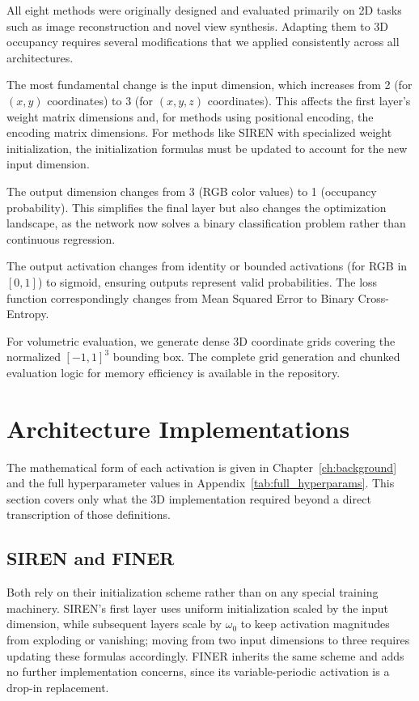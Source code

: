 All eight methods were originally designed and evaluated primarily on 2D tasks such as image reconstruction and novel view synthesis. Adapting them to 3D occupancy requires several modifications that we applied consistently across all architectures.

The most fundamental change is the input dimension, which increases from 2 (for $(x, y)$ coordinates) to 3 (for $(x, y, z)$ coordinates). This affects the first layer's weight matrix dimensions and, for methods using positional encoding, the encoding matrix dimensions. For methods like SIREN with specialized weight initialization, the initialization formulas must be updated to account for the new input dimension.

The output dimension changes from 3 (RGB color values) to 1 (occupancy probability). This simplifies the final layer but also changes the optimization landscape, as the network now solves a binary classification problem rather than continuous regression.

The output activation changes from identity or bounded activations (for RGB in $[0, 1]$) to sigmoid, ensuring outputs represent valid probabilities. The loss function correspondingly changes from Mean Squared Error to Binary Cross-Entropy.

For volumetric evaluation, we generate dense 3D coordinate grids covering the normalized $[-1, 1]^3$ bounding box. The complete grid generation and chunked evaluation logic for memory efficiency is available in the repository.

\section{Architecture Implementations}

The mathematical form of each activation is given in Chapter~\ref{ch:background} and the full hyperparameter values in Appendix~\ref{tab:full_hyperparams}. This section covers only what the 3D implementation required beyond a direct transcription of those definitions.

\subsection{SIREN and FINER}

Both rely on their initialization scheme rather than on any special training machinery. SIREN's first layer uses uniform initialization scaled by the input dimension, while subsequent layers scale by $\omega_0$ to keep activation magnitudes from exploding or vanishing; moving from two input dimensions to three requires updating these formulas accordingly. FINER inherits the same scheme and adds no further implementation concerns, since its variable-periodic activation is a drop-in replacement.

